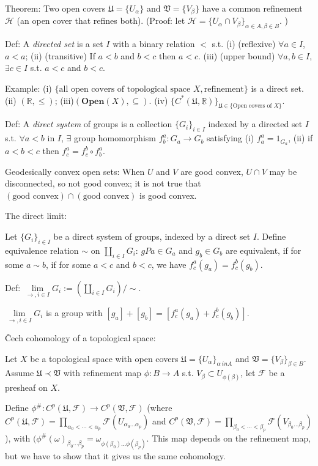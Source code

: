 \documentclass{article}
\theoremstyle{mystyle}
\theoremstyle{remark}
\numberwithin{equation}{section}
\begin{document}
Theorem: Two open covers $\mathfrak{U} = \{U_\alpha\}$ and $\mathfrak{V} = \{V_\beta\}$ have a common refinement $\mathcal{H}$ (an open cover that refines both). (Proof: let $\mathcal{H} = \{U_\alpha \cap V_\beta\}_{\alpha \in A,\beta \in B}$. )

Def: A \emph{directed set} is a set $I$ with a binary relation $<$ s.t. (i) (reflexive) $\forall a \in I$, $a<a$; (ii) (transitive) If $a<b$ and $b<c$ then $a<c$. (iii) (upper bound) $\forall a,b\in I$, $\exists c\in I$ s.t. $a<c$ and $b<c$. 

Example: (i) $\{\text{all open covers of topological space }X, \text{refinement}\}$ is a direct set. (ii) $(\mathbb{R},\leq )$; (iii)$(\mathbf{Open}(X),\subseteq)$. (iv) $\{C^*(\mathfrak{U},\underline{\mathbb{R}})\}_{\mathfrak{U}\in \{\text{Open covers of }X\}}$. 


Def: A \emph{direct system} of groups is a collection $\{G_i\}_{i \in I}$ indexed by a directed set $I$ s.t. $\forall a<b$ in $I$, $\exists$ group homomorphism $f^a_b\colon G_a\rightarrow G_b$ satisfying (i) $f^a_a = 1_{G_a}$, (ii) if $a<b<c$ then $f^a_c = f^b_c\circ f^a_b$. 

Geodesically convex open sets: When $U$ and $V$ are good convex, $U\cap V$ may be disconnected, so not good convex; it is not true that $(\text{good convex}) \cap (\text{good convex})$ is good convex.

The direct limit:

Let $\{G_i\}_{i\in I}$ be a direct system of groups, indexed by a direct set $I$. Define equivalence relation $\sim$ on $\amalg_{i\in I} G_i$: $gPa\in G_a$ and $g_b\in G_b$ are equivalent, if for some $a\sim b$, if for some $a<c$ and $b<c$,  we have $f^a_c(g_a)=f^b_c(g_b)$. 

Def: $\lim\limits_{\rightarrow,i\in I}G_i:=
(\amalg_{i\in I}G_i)/\sim.$

$\lim\limits_{\rightarrow,i\in I}G_i$ is a group with $[g_a]+[g_b] = [f^a_c(g_a)+f^b_c(g_b)]$. 

Čech cohomology of a topological space:

Let $X$ be a topological space with open covers $\mathfrak{U} = \{U_\alpha\}_{\alpha\ in A}$ and $\mathfrak{V} = \{V_\beta\}_{\beta \in B}$. Assume $\mathfrak{U}\prec \mathfrak{V}$ with refinement map $\phi\colon B\rightarrow A$ s.t. $V_\beta \subset U_{\phi(\beta)}$, let $\mathcal{F}$ be a presheaf on $X$. 

Define $\phi^\#\colon C^p(\mathfrak{U},\mathcal{F})\rightarrow C^p(\mathfrak{V},\mathcal{F})$ (where 
$C^p(\mathfrak{U},\mathcal{F})= \prod_{\alpha_0<\cdots<\alpha_p}\mathcal{F}(U_{\alpha_0...\alpha_p})$ and $C^p(\mathfrak{V},\mathcal{F})= \prod_{\beta_0<\cdots<\beta_p}\mathcal{F}(V_{\beta_0...\beta_p})$), with $(\phi^\#(\omega)_{\beta_0...\beta_p} = \omega_{\phi(\beta_0)...\phi(\beta_p)}$. This map depends on the refinement map, but we have to show that it gives us the same cohomology.
\end{document}
